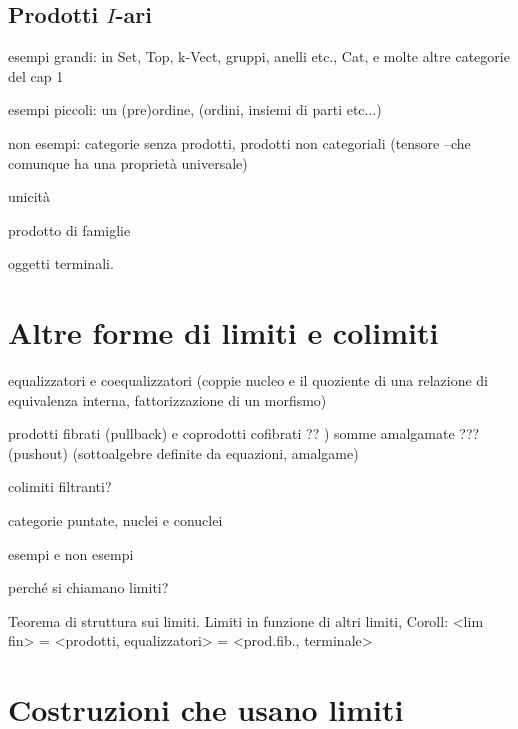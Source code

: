 \subsection{Prodotti $I$-ari}



\bigskip
esempi grandi: in Set, Top, k-Vect, gruppi, anelli etc., Cat, e molte altre categorie del cap 1

esempi piccoli: un (pre)ordine, (ordini, insiemi di parti etc...)

non esempi: categorie senza prodotti, prodotti non categoriali (tensore --che comunque ha una proprietà universale)

unicità

prodotto di famiglie

oggetti terminali.


\begin{esercizi}
	\item
	\item
	\item
	\item
	\item
\end{esercizi}
\section{Altre forme di limiti e colimiti}

equalizzatori e coequalizzatori (coppie nucleo e il quoziente di una relazione di equivalenza interna, fattorizzazione di un morfismo)

prodotti fibrati (pullback) e coprodotti cofibrati ?? ) somme amalgamate ??? (pushout) (sottoalgebre definite da equazioni, amalgame)

colimiti filtranti?

categorie puntate, nuclei e conuclei

esempi e non esempi

perché si chiamano limiti?
\begin{theorem}
	Teorema di struttura sui limiti. Limiti in funzione di altri limiti, Coroll: <lim fin> = <prodotti, equalizzatori> = <prod.fib., terminale>
\end{theorem}

\section{Costruzioni che usano limiti}
